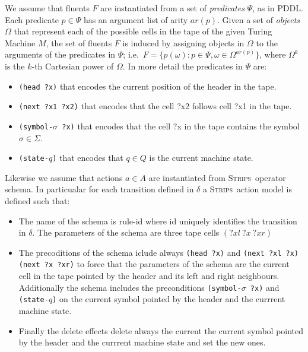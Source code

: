 \documentclass[letterpaper]{article} %
\newcommand{\strips}{\textsc{Strips}}     %
\begin{document}
We assume that fluents $F$ are instantiated from a set of {\em predicates} $\Psi$, as in PDDL. Each predicate $p\in\Psi$ has an argument list of arity $ar(p)$. Given a set of {\em objects} $\Omega$ that represent each of the possible cells in the tape of the given Turing Machine $M$, the set of fluents $F$ is induced by assigning objects in $\Omega$ to the arguments of the predicates in $\Psi$; i.e.~$F=\{p(\omega):p\in\Psi,\omega\in\Omega^{ar(p)}\}$, where $\Omega^k$ is the $k$-th Cartesian power of $\Omega$. In more detail the predicates in $\Psi$ are:
\begin{itemize}
\item {\tt (head ?x)} that encodes the current position of the header in the tape.
\item {\tt (next ?x1 ?x2)} that encodes that the cell ?x2 follows cell ?x1 in the tape.
\item {\tt (symbol-$\sigma$ ?x)} that encodes that the cell ?x in the tape contains the symbol $\sigma\in\Sigma$.
\item {\tt (state-$q$)} that encodes that $q\in Q$ is the current machine state.
\end{itemize}

Likewise we assume that actions $a\in A$ are instantiated from \strips\ operator schema. In particualar for each transition defined in $\delta$ a \strips\ action model is defined such that:
\begin{itemize}
\item The name of the schema is rule-id where id uniquely identifies the transition in $\delta$. The parameters of the schema are three tape cells $(?xl\ ?x\ ?xr)$
\item The precoditions of the schema iclude always {\tt(head ?x)} and {\tt (next ?xl ?x) (next ?x ?xr)} to force that the parameters of the schema are the current cell in the tape pointed by the header and its left and right neighbours. Additionally the schema includes the preconditions {\tt(symbol-$\sigma$ ?x)} and {\tt (state-$q$)} on the current symbol pointed by the header and the currrent machine state.
\item Finally the delete effects delete always the current the current symbol pointed by the header and the currrent machine state and set the new ones.
\end{itemize}
\end{document}
